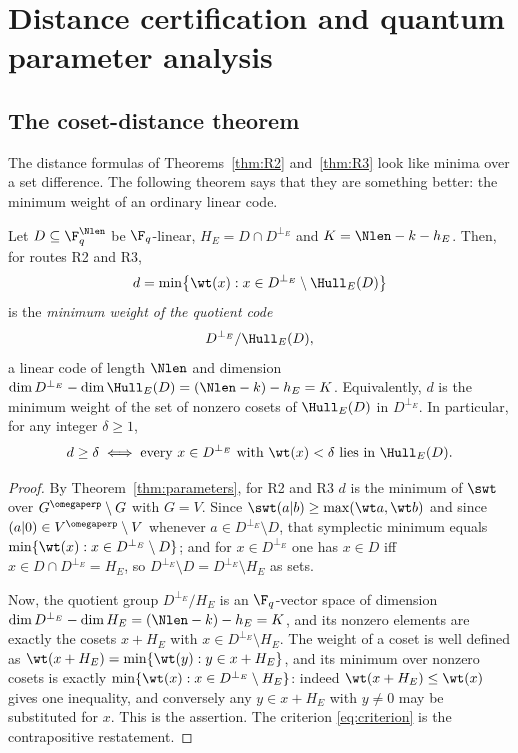 \section{Distance certification and quantum parameter analysis}
\label{sec:cert}

\subsection{The coset-distance theorem}

The distance formulas of Theorems~\ref{thm:R2} and~\ref{thm:R3} look like
minima over a set difference. The following theorem says that they are
something better: the minimum weight of an ordinary linear code.

\begin{theorem}\label{thm:cosetdistance}
Let $D\subseteq\F_q^{\Nlen}$ be $\F_q$-linear, $H_E=D\cap D^{\perp_E}$ and
$K=\Nlen-k-h_E$. Then, for routes R2 and R3,
\[
  d=\min\bigl\{\wt(x):x\in D^{\perp_E}\setminus\Hull_E(D)\bigr\}
\]
is the \emph{minimum weight of the quotient code}
\[
  D^{\perp_E}/\Hull_E(D),
\]
a linear code of length $\Nlen$ and dimension
$\dim D^{\perp_E}-\dim\Hull_E(D)=(\Nlen-k)-h_E=K$. Equivalently, $d$ is the
minimum weight of the set of nonzero cosets of $\Hull_E(D)$ in $D^{\perp_E}$.
In particular, for any integer $\delta\ge1$,
\begin{equation}\label{eq:criterion}
  d\ge\delta
  \iff
  \text{every }x\in D^{\perp_E}\text{ with }\wt(x)<\delta
  \text{ lies in }\Hull_E(D).
\end{equation}
\end{theorem}

\begin{proof}
By Theorem~\ref{thm:parameters}, for R2 and R3
$d$ is the minimum of $\swt$ over $G^{\omegaperp}\setminus G$ with $G=V$.
Since $\swt(a|b)\ge\max(\wt a,\wt b)$ and since
$(a|0)\in V^{\omegaperp}\setminus V$ whenever $a\in D^{\perp_E}\setminus D$,
that symplectic minimum equals
$\min\{\wt(x):x\in D^{\perp_E}\setminus D\}$; and for $x\in D^{\perp_E}$ one
has $x\in D$ iff $x\in D\cap D^{\perp_E}=H_E$, so
$D^{\perp_E}\setminus D=D^{\perp_E}\setminus H_E$ as sets.

Now, the quotient group $D^{\perp_E}/H_E$ is an $\F_q$-vector space of
dimension $\dim D^{\perp_E}-\dim H_E=(\Nlen-k)-h_E=K$, and its nonzero elements
are exactly the cosets $x+H_E$ with $x\in D^{\perp_E}\setminus H_E$. The weight
of a coset is well defined as
$\wt(x+H_E)=\min\{\wt(y):y\in x+H_E\}$, and its minimum over nonzero cosets is
exactly $\min\{\wt(x):x\in D^{\perp_E}\setminus H_E\}$: indeed
$\wt(x+H_E)\le\wt(x)$ gives one inequality, and conversely any $y\in x+H_E$
with $y\ne0$ may be substituted for $x$. This is the assertion. The criterion
\eqref{eq:criterion} is the contrapositive restatement.
\end{proof}

